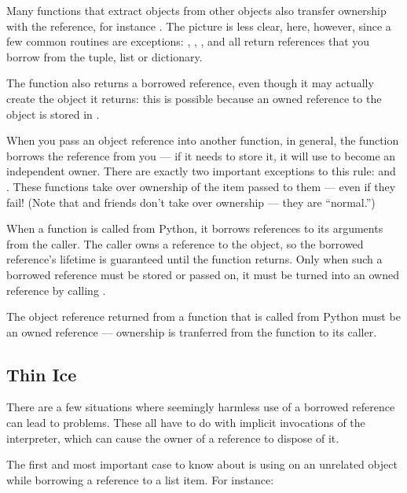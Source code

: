 \documentclass{manual}
\begin{document}
Many functions that extract objects from other objects also transfer
ownership with the reference, for instance
.  The picture is less clear, here,
however, since a few common routines are exceptions:
, ,
, and 
all return references that you borrow from the tuple, list or
dictionary.

The function  also returns a borrowed
reference, even though it may actually create the object it returns:
this is possible because an owned reference to the object is stored in
.

When you pass an object reference into another function, in general,
the function borrows the reference from you --- if it needs to store
it, it will use  to become an independent
owner.  There are exactly two important exceptions to this rule:
 and .  These
functions take over ownership of the item passed to them --- even if
they fail!  (Note that  and friends don't
take over ownership --- they are ``normal.'')

When a \C{} function is called from Python, it borrows references to its
arguments from the caller.  The caller owns a reference to the object,
so the borrowed reference's lifetime is guaranteed until the function
returns.  Only when such a borrowed reference must be stored or passed
on, it must be turned into an owned reference by calling
.

The object reference returned from a \C{} function that is called from
Python must be an owned reference --- ownership is tranferred from the
function to its caller.

\subsection{Thin Ice}
\label{thinIce}

There are a few situations where seemingly harmless use of a borrowed
reference can lead to problems.  These all have to do with implicit
invocations of the interpreter, which can cause the owner of a
reference to dispose of it.

The first and most important case to know about is using
 on an unrelated object while borrowing a
reference to a list item.  For instance:
\end{document}
